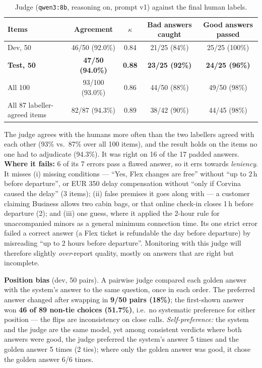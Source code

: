 \documentclass[10pt,a4paper]{article}
\newcommand{\code}[1]{\texttt{#1}}
\begin{document}
\begin{table}[htbp]
\centering\small
\begin{tabular}{@{}lcccc@{}}
\toprule
Items & Agreement & $\kappa$ & Bad answers caught & Good answers passed \\
\midrule
Dev, 50 & 46/50 (92.0\%) & 0.84 & 21/25 (84\%) & 25/25 (100\%) \\
\textbf{Test, 50} & \textbf{47/50 (94.0\%)} & \textbf{0.88} & \textbf{23/25 (92\%)} & \textbf{24/25 (96\%)} \\
All 100 & 93/100 (93.0\%) & 0.86 & 44/50 (88\%) & 49/50 (98\%) \\
All 87 labeller-agreed items & 82/87 (94.3\%) & 0.89 & 38/42 (90\%) & 44/45 (98\%) \\
\bottomrule
\end{tabular}
\caption{Judge (\code{qwen3:8b}, reasoning on, prompt v1) against the final human labels.}
\label{tab:judge}
\end{table}

The judge agrees with the humans more often than the two labellers agreed with each other (93\% vs.\ 87\% over all 100 items), and the result holds on the items no one had to adjudicate (94.3\%). It was right on 16 of the 17 padded answers. \textbf{Where it fails:} 6 of its 7 errors pass a flawed answer, so it errs towards \emph{leniency}. It misses (i) missing conditions --- ``Yes, Flex changes are free'' without ``up to 2\,h before departure'', or EUR 350 delay compensation without ``only if Corvina caused the delay'' (3 items); (ii) false premises it goes along with --- a customer claiming Business allows two cabin bags, or that online check-in closes 1\,h before departure (2); and (iii) one guess, where it applied the 2-hour rule for unaccompanied minors as a general minimum connection time. Its one strict error failed a correct answer (a Flex ticket is refundable the day before departure) by misreading ``up to 2 hours before departure''. Monitoring with this judge will therefore slightly \emph{over}-report quality, mostly on answers that are right but incomplete.

\textbf{Position bias} (dev, 50 pairs). A pairwise judge compared each golden answer with the system's answer to the same question, once in each order. The preferred answer changed after swapping in \textbf{9/50 pairs (18\%)}; the first-shown answer won \textbf{46 of 89 non-tie choices (51.7\%)}, i.e.\ no systematic preference for either position --- the flips are inconsistency on close calls. \emph{Self-preference:} the system and the judge are the same model, yet among consistent verdicts where both answers were good, the judge preferred the system's answer 5 times and the golden answer 5 times (2 ties); where only the golden answer was good, it chose the golden answer 6/6 times.
\end{document}
